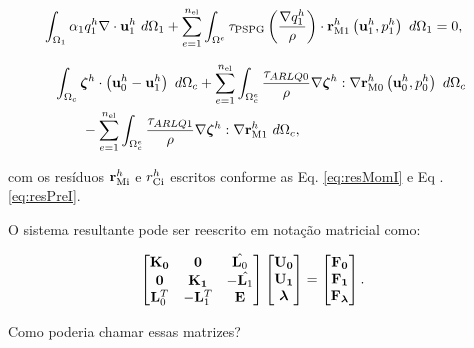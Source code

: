 \documentclass[tese_patricia]{subfiles}
\begin{document}
\begin{align}
	\begin{split}
		&	\int_{\Omega_{1}} \alpha_1 q_1^h \nabla \cdot \mathbf{u}_1^h \ d\Omega_{1}+
		\sum_{e=1}^{n_{\mathrm{el}}} \int_{\Omega^e} \tau_{\mathrm{PSPG}} \left(\frac{\nabla q_1^h}{\rho}\right) \cdot \mathbf{r}_{\mathrm{M1}}^{h} \left(\mathbf{u}_1^h,p_1^h\right) \  d\Omega_{1} = 0, 
		\label{eq:RC1est}
	\end{split}
\end{align}


\begin{align}
	\begin{split}
	&\int_{\Omega_{c}}  \boldsymbol{\zeta}^h  \cdot \left(\mathbf{u}_0^h - \mathbf{u}_1^h \right) \ d\Omega_{c} + \sum_{e=1}^{n_{\mathrm{el}}} \int_{\Omega^e_{c}} \frac{\tau_{ARLQ0}}{\rho} \nabla \boldsymbol{\zeta}^h : \nabla \mathbf{r}_{\mathrm{M0}}^{h}\left(\mathbf{u}_0^h,p_0^h\right) \ d\Omega_{c}  \\
	&\qquad-\sum_{e=1}^{n_{\mathrm{el}}} \int_{\Omega^e_{c}} \frac{\tau_{ARLQ1}}{\rho} \nabla \boldsymbol{\zeta}^h : \nabla \mathbf{r}_{\mathrm{M1}}^{h} \ d\Omega_{c},
	\label{eq:EqAcoplaest}
\end{split}
\end{align}

\noindent com os resíduos $\mathbf{r}_{\mathrm{Mi}}^{h}$ e $r_{\mathrm{Ci}}^{h}$ escritos conforme as Eq. \ref{eq:resMomI} e Eq .\ref{eq:resPreI}.

O sistema resultante pode ser reescrito em notação matricial como:

\begin{align}
	\begin{bmatrix}
		\mathbf{K_{0}} & \mathbf{0} & \hat{\mathbf{L}_{0}} \\
		\mathbf{0} & \mathbf{K_{1}} & - \hat{\mathbf{L}_{1}} \\
		\mathbf{L}_{0}^{T} & -\mathbf{L}_{1}^{T} & \mathbf{E}
	\end{bmatrix}
	\begin{bmatrix}
		\mathbf{U_{0}} \\
		\mathbf{U_{1}} \\
		\boldsymbol{\lambda}
	\end{bmatrix}
	&=
	\begin{bmatrix}
		\mathbf{F_{0}} \\
		\mathbf{F_{1}} \\
		\mathbf{F_{\boldsymbol{\lambda}}}
	\end{bmatrix}.
	\label{eq:sistema_linear}
\end{align}	

Como poderia chamar essas matrizes?
\end{document}
